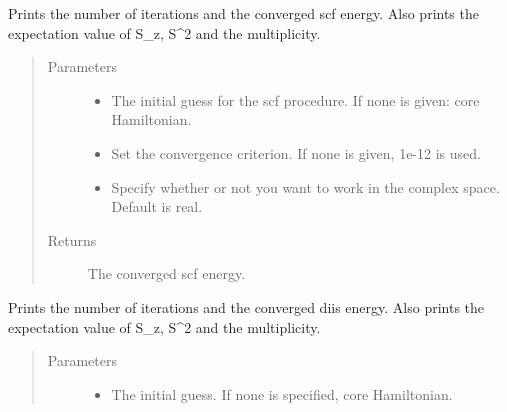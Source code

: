 \documentclass[letterpaper,10pt,english]{sphinxmanual}
\begin{document}
\begin{fulllineitems}
\begin{fulllineitems}
\label{\detokenize{UHF:hf.HartreeFock.UHF.MF.get_scf_solution}}
Prints the number of iterations and the converged scf energy.
Also prints the expectation value of S\_z, S\textasciicircum{}2 and the multiplicity.
\begin{quote}\begin{description}
\item[{Parameters}] \leavevmode\begin{itemize}
\item {} 
 \textendash{} The initial guess for the scf procedure. If none is given: core Hamiltonian.

\item {} 
 \textendash{} Set the convergence criterion. If none is given, 1e-12 is used.

\item {} 
 \textendash{} Specify whether or not you want to work in the complex space. Default is real.

\end{itemize}

\item[{Returns}] \leavevmode
The converged scf energy.

\end{description}\end{quote}

\end{fulllineitems}


\begin{fulllineitems}
\label{\detokenize{UHF:hf.HartreeFock.UHF.MF.get_scf_solution_diis}}
Prints the number of iterations and the converged diis energy.
Also prints the expectation value of S\_z, S\textasciicircum{}2 and the multiplicity.
\begin{quote}\begin{description}
\item[{Parameters}] \leavevmode\begin{itemize}
\item {} 
 \textendash{} The initial guess. If none is specified, core Hamiltonian.


\end{itemize}
\end{description}
\end{quote}
\end{fulllineitems}
\end{fulllineitems}
\end{document}

